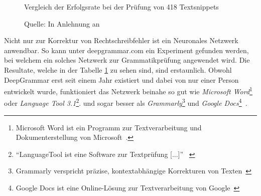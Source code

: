 \documentclass{hwz}
\begin{document}
\begin{figure} %
    \centering
    \caption{Vergleich der Erfolgsrate bei der Prüfung von 418 Textsnippets}
    \label{deepgrammar}
    \caption*{Quelle: In Anlehnung an \textcite{MuganEvaluationComparison}}
\end{figure} %
Nicht nur zur Korrektur von Rechtschreibfehler ist ein Neuronales Netzwerk anwendbar. So kann unter deepgrammar.com ein Experiment gefunden werden, bei welchem ein solches Netzwerk zur Grammatikprüfung angewendet wird. Die Resultate, welche in der Tabelle \ref{deepgrammar} zu sehen sind, sind erstaunlich. Obwohl DeepGrammar erst seit einem Jahr existiert und dabei von nur einer Person entwickelt wurde, funktioniert das Netzwerk beinahe so gut wie \textit{Microsoft Word}\footnote{Microsoft Word ist ein Programm zur Textverarbeitung und Dokumenterstellung von Microsoft~\autocite{MicrosoftCorporation2018MicrosoftOffice}.} oder \textit{Language Tool 3.1}\footnote{\enquote{LanguageTool ist eine Software zur Textprüfung [...]}~ \autocite{LanguageTool2018LanguageToolGrammatik}}. und sogar besser als \textit{Grammarly}\footnote{Grammarly verspricht präzise, kontextabhängige Korrekturen von Texten~\autocite{GramarlyInc.2018Grammarly:Checker}} und \textit{Google Docs}\footnote{Google Docs ist eine Online-Lösung zur Textverarbeitung von Google~\autocite{GoogleLLC2018GoogleBearbeiten}}~\autocite{MuganEvaluationComparison}.
\end{document}
